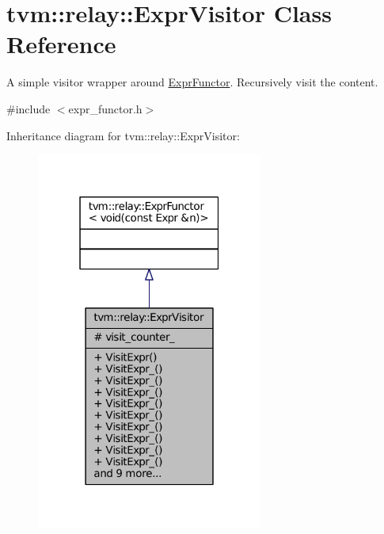 \hypertarget{classtvm_1_1relay_1_1ExprVisitor}{}\section{tvm\+:\+:relay\+:\+:Expr\+Visitor Class Reference}
\label{classtvm_1_1relay_1_1ExprVisitor}


A simple visitor wrapper around \hyperlink{classtvm_1_1relay_1_1ExprFunctor}{Expr\+Functor}. Recursively visit the content.  




{\ttfamily \#include $<$expr\+\_\+functor.\+h$>$}



Inheritance diagram for tvm\+:\+:relay\+:\+:Expr\+Visitor\+:
\nopagebreak
\begin{figure}[H]
\begin{center}
\leavevmode
\includegraphics[width=211pt]{classtvm_1_1relay_1_1ExprVisitor__inherit__graph}
\end{center}
\end{figure}


